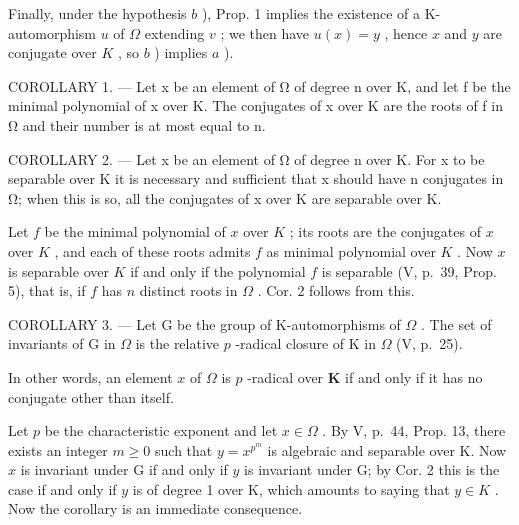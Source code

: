 Finally, under the hypothesis \(b\) ), Prop. 1 implies the existence of a K-automorphism \(u\) of \(\Omega\) extending \(v\) ; we then have \(u(x) = y\) , hence \(x\) and \(y\) are conjugate over \(K\) , so \(b\) ) implies \(a\) ).

COROLLARY 1. --- Let x be an element of Ω of degree n over K, and let f be the minimal polynomial of x over K. The conjugates of x over K are the roots of f in Ω and their number is at most equal to n.

COROLLARY 2. --- Let x be an element of Ω of degree n over K. For x to be separable over K it is necessary and sufficient that x should have n conjugates in Ω; when this is so, all the conjugates of x over K are separable over K.

Let \(f\) be the minimal polynomial of \(x\) over \(K\) ; its roots are the conjugates of \(x\) over \(K\) , and each of these roots admits \(f\) as minimal polynomial over \(K\) . Now \(x\) is separable over \(K\) if and only if the polynomial \(f\) is separable (V, p.~39, Prop. 5), that is, if \(f\) has \(n\) distinct roots in \(\Omega\) . Cor. 2 follows from this.

COROLLARY 3. --- Let G be the group of K-automorphisms of \(\Omega\) . The set of invariants of G in \(\Omega\) is the relative \(p\) -radical closure of K in \(\Omega\) (V, p.~25).

In other words, an element \(x\) of \(\Omega\) is \(p\) -radical over \(\mathbf{K}\) if and only if it has no conjugate other than itself.

Let \(p\) be the characteristic exponent and let \(x \in \Omega\) . By V, p.~44, Prop. 13, there exists an integer \(m \geqslant 0\) such that \(y = x^{p^m}\) is algebraic and separable over K. Now \(x\) is invariant under G if and only if \(y\) is invariant under G; by Cor. 2 this is the case if and only if \(y\) is of degree 1 over K, which amounts to saying that \(y \in K\) . Now the corollary is an immediate consequence.

